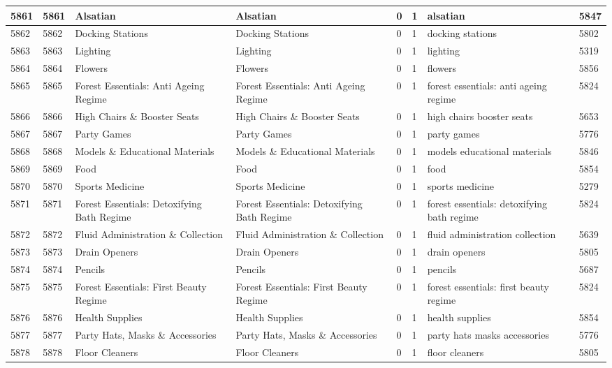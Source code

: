 \begin{longtable}{|l|l|l|l|l|l|l|l|}
5861 & 5861 & Alsatian & Alsatian & 0 & 1 & alsatian & 5847 \\ \hline 
5862 & 5862 & Docking Stations & Docking Stations & 0 & 1 & docking stations & 5802 \\ \hline 
5863 & 5863 & Lighting & Lighting & 0 & 1 & lighting & 5319 \\ \hline 
5864 & 5864 & Flowers & Flowers & 0 & 1 & flowers & 5856 \\ \hline 
5865 & 5865 & Forest Essentials: Anti Ageing Regime & Forest Essentials: Anti Ageing Regime & 0 & 1 & forest essentials: anti ageing regime & 5824 \\ \hline 
5866 & 5866 & High Chairs \& Booster Seats & High Chairs \& Booster Seats & 0 & 1 & high chairs booster seats & 5653 \\ \hline 
5867 & 5867 & Party Games & Party Games & 0 & 1 & party games & 5776 \\ \hline 
5868 & 5868 & Models \& Educational Materials & Models \& Educational Materials & 0 & 1 & models educational materials & 5846 \\ \hline 
5869 & 5869 & Food & Food & 0 & 1 & food & 5854 \\ \hline 
5870 & 5870 & Sports Medicine & Sports Medicine & 0 & 1 & sports medicine & 5279 \\ \hline 
5871 & 5871 & Forest Essentials: Detoxifying Bath Regime & Forest Essentials: Detoxifying Bath Regime & 0 & 1 & forest essentials: detoxifying bath regime & 5824 \\ \hline 
5872 & 5872 & Fluid Administration \& Collection & Fluid Administration \& Collection & 0 & 1 & fluid administration collection & 5639 \\ \hline 
5873 & 5873 & Drain Openers & Drain Openers & 0 & 1 & drain openers & 5805 \\ \hline 
5874 & 5874 & Pencils & Pencils & 0 & 1 & pencils & 5687 \\ \hline 
5875 & 5875 & Forest Essentials: First Beauty Regime & Forest Essentials: First Beauty Regime & 0 & 1 & forest essentials: first beauty regime & 5824 \\ \hline 
5876 & 5876 & Health Supplies & Health Supplies & 0 & 1 & health supplies & 5854 \\ \hline 
5877 & 5877 & Party Hats, Masks \& Accessories & Party Hats, Masks \& Accessories & 0 & 1 & party hats masks accessories & 5776 \\ \hline 
5878 & 5878 & Floor Cleaners & Floor Cleaners & 0 & 1 & floor cleaners & 5805 \\ \hline 

\end{longtable}
